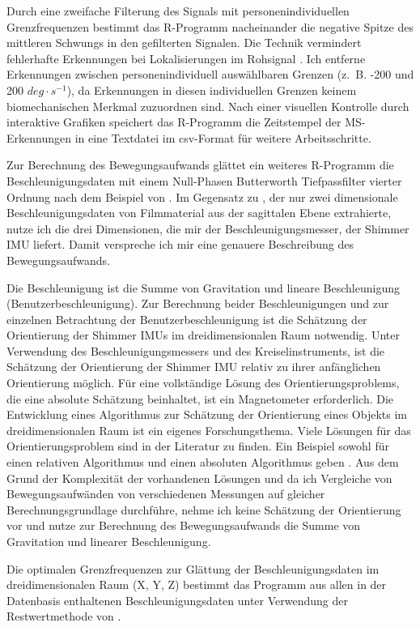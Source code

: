 Durch eine zweifache Filterung des Signals mit personenindividuellen Grenzfrequenzen bestimmt das R-Programm nacheinander die negative Spitze des mittleren Schwungs in den gefilterten Signalen. Die Technik vermindert fehlerhafte Erkennungen bei Lokalisierungen im Rohsignal \citep{Lee2011}. Ich entferne Erkennungen zwischen personenindividuell auswählbaren Grenzen (z.~B. -200 und 200 $deg \cdot s^{-1}$), da Erkennungen in diesen individuellen Grenzen keinem biomechanischen Merkmal zuzuordnen sind. Nach einer visuellen Kontrolle durch interaktive Grafiken speichert das R-Programm die Zeitstempel der \ac{MS}-Erkennungen in eine Textdatei im \acs{csv}-Format für weitere Arbeitsschritte.

Zur Berechnung des Bewegungsaufwands glättet ein weiteres R-Programm die Beschleunigungsdaten mit einem Null-Phasen Butterworth Tiefpassfilter vierter Ordnung nach dem Beispiel von \citet{Hreljac2000}. Im Gegensatz zu \citet{Hreljac2000}, der nur zwei dimensionale Beschleunigungsdaten von Filmmaterial aus der sagittalen Ebene extrahierte, nutze ich die drei Dimensionen, die mir der Beschleunigungsmesser, der Shimmer \ac{IMU} liefert. Damit verspreche ich mir eine genauere Beschreibung des Bewegungsaufwands.

Die Beschleunigung ist die Summe von Gravitation und lineare Beschleunigung (Benutzerbeschleunigung). Zur Berechnung beider Beschleunigungen und zur einzelnen Betrachtung der Benutzerbeschleunigung ist die Schätzung der Orientierung der Shimmer \acp{IMU} im dreidimensionalen Raum notwendig. Unter Verwendung des Beschleunigungsmessers und des Kreiselinstruments, ist die Schätzung der Orientierung der Shimmer \ac{IMU} relativ zu ihrer anfänglichen Orientierung möglich. Für eine vollständige Lösung des Orientierungsproblems, die eine absolute Schätzung beinhaltet, ist ein Magnetometer erforderlich. Die Entwicklung eines Algorithmus zur Schätzung der Orientierung eines Objekts im dreidimensionalen Raum ist ein eigenes Forschungsthema. Viele Lösungen für das Orientierungsproblem sind in der Literatur zu finden. Ein Beispiel sowohl für einen relativen Algorithmus und einen absoluten Algorithmus geben \citet{Madgwick2011}. Aus dem Grund der Komplexität der vorhandenen Lösungen und da ich Vergleiche von Bewegungsaufwänden von verschiedenen Messungen auf gleicher Berechnungsgrundlage durchführe, nehme ich keine Schätzung der Orientierung vor und nutze zur Berechnung des Bewegungsaufwands die Summe von Gravitation und linearer Beschleunigung.

Die optimalen Grenzfrequenzen zur Glättung der Beschleunigungsdaten im dreidimensionalen Raum (X, Y, Z) bestimmt das Programm aus allen in der Datenbasis enthaltenen Beschleunigungsdaten unter Verwendung der Restwertmethode von \citet{Wells1980}. 

